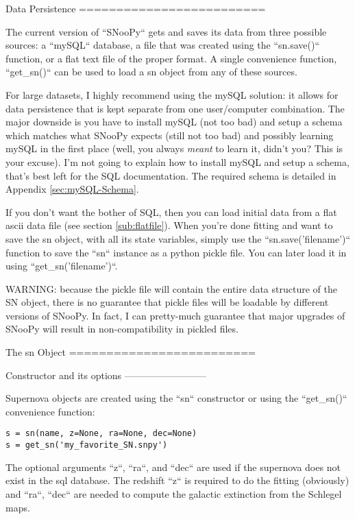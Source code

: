 Data Persistence\label{sec:Data-Persistance}
=========================

The current version of ``SNooPy`` gets and saves its data from
three possible sources: a ``mySQL`` database, a file that was
created using the ``sn.save()`` function, or a flat text file
of the proper format. A single convenience function, ``get_sn()``
can be used to load a sn object from any of these sources. 

For large datasets, I highly recommend using the mySQL solution: it
allows for data persistence that is kept separate from one user/computer
combination. The major downside is you have to install mySQL (not
too bad) and setup a schema which matches what SNooPy expects (still
not too bad) and possibly learning mySQL in the first place (well,
you always \emph{meant} to learn it, didn't you? This is your excuse).
I'm not going to explain how to install mySQL and setup a schema,
that's best left for the SQL documentation. The required schema is
detailed in Appendix \ref{sec:mySQL-Schema}.

If you don't want the bother of SQL, then you can load initial data
from a flat ascii data file (see section \ref{sub:flatfile}). When
you're done fitting and want to save the sn object, with all its state
variables, simply use the ``sn.save('filename')`` function to
save the ``sn`` instance as a python pickle file. You can later
load it in using ``get_sn('filename')``. 

WARNING: because the pickle file will contain the entire data structure
of the SN object, there is no guarantee that pickle files will be
loadable by different versions of SNooPy. In fact, I can pretty-much
guarantee that major upgrades of SNooPy will result in non-compatibility
in pickled files.


The sn Object\label{sec:The-super-Object}
=========================


Constructor and its options
--------------------------

Supernova objects are created using the ``sn`` constructor or
using the ``get_sn()`` convenience function:

 \begin{verbatim}
s = sn(name, z=None, ra=None, dec=None)
s = get_sn('my_favorite_SN.snpy')
\end{verbatim}

The optional arguments ``z``, ``ra``, and ``dec`` are
used if the supernova does not exist in the sql database. The redshift
``z`` is required to do the fitting (obviously) and ``ra``,
``dec`` are needed to compute the galactic extinction from the
Schlegel maps.


